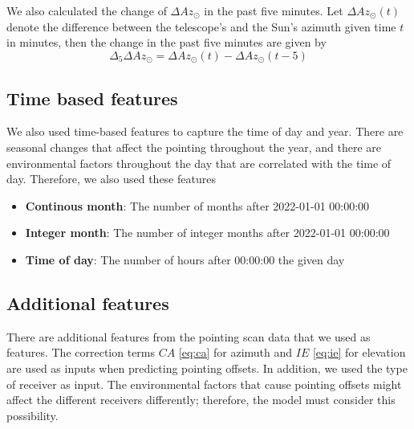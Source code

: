 We also calculated the change of $\Delta Az_\odot$ in the past five minutes.
Let $\Delta Az_\odot(t)$ denote the difference between the telescope's and the Sun's azimuth given time $t$ in minutes,
then the change in the past five minutes are given by
\begin{equation}
    \Delta_5 \Delta Az_\odot=\Delta Az_\odot(t)-\Delta Az_\odot(t-5)
\end{equation}

\subsection{Time based features}
We also used time-based features to capture the time of day and year.
There are seasonal changes that affect the pointing throughout the year, and there are environmental factors throughout the day that are correlated with the time of day.
Therefore, we also used these features
\begin{itemize}
    \item \textbf{Continous month}: The number of months after 2022-01-01 00:00:00
    \item \textbf{Integer month}: The number of integer months after 2022-01-01 00:00:00 
    \item \textbf{Time of day}: The number of hours after 00:00:00 the given day
\end{itemize}

\subsection{Additional features}
There are additional features from the pointing scan data that we used as features.
The correction terms $CA$ \eqref{eq:ca} for azimuth and $IE$ \eqref{eq:ie} for elevation are used as inputs when predicting pointing offsets.
In addition, we used the type of receiver as input.
The environmental factors that cause pointing offsets might affect the different receivers differently; therefore, the model must consider this possibility.


